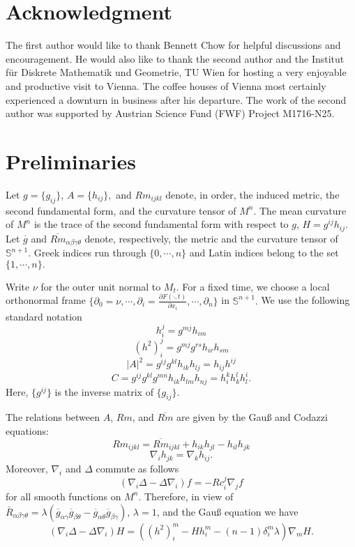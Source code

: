 \documentclass{amsart}
\theoremstyle{definition}
\theoremstyle{remark}
\numberwithin{equation}{section}
\begin{document}
\section*{Acknowledgment}
The first author would like to thank Bennett Chow for helpful discussions and encouragement. He would also like to thank the second author and the Institut f\"ur Diskrete Mathematik und Geometrie, TU Wien for hosting a very enjoyable and productive visit to Vienna. The coffee houses of Vienna most certainly experienced a downturn in business after his departure. The work of the second author was supported by Austrian Science Fund (FWF) Project M1716-N25.

\section{Preliminaries}
Let $g=\{g_{ij}\}$, $A=\{h_{ij}\},$ and $Rm_{ijkl}$ denote, in order, the induced metric, the second fundamental form, and the curvature tensor of $M^n$. The mean curvature of $M^n$ is the trace of the second fundamental form with respect to $g$, $H=g^{ij}h_{ij}.$ Let $\overline{g}$ and $\overline{Rm}_{\alpha\beta\gamma\theta}$ denote, respectively, the metric and the curvature tensor of $\mathbb{S}^{n+1}$. Greek indices run through $\{0,\cdots,n\}$ and Latin indices belong to the set $\{1,\cdots,n\}.$

Write $\nu$ for the outer unit normal to $M_t.$ For a fixed time, we choose a local orthonormal frame $\{\partial_0=\nu,\cdots,\partial_i=\frac{\partial F(\cdot,t)}{\partial x_i},\cdots,\partial_n\}$ in $\mathbb{S}^{n+1}.$ We use the following standard notation
\[h_i^j=g^{mj}h_{im}\]
\[(h^2)_i^j=g^{mj}g^{rs}h_{ir}h_{sm}\]
\[|A|^2=g^{ij}g^{kl}h_{ik}h_{lj}=h_{ij}h^{ij}\]
\[C=g^{ij}g^{kl}g^{mn}h_{ik}h_{lm}h_{nj}=h_i^kh_k^lh_l^i.\]
Here, $\{g^{ij}\}$ is the inverse matrix of $\{g_{ij}\}.$

The relations between $A$, $Rm$, and $\overline{Rm}$ are given by the Gau{\ss} and Codazzi equations:
\[Rm_{ijkl}=\overline{Rm}_{ijkl}+h_{ik}h_{jl}-h_{il}h_{jk}\]
\[\nabla_ih_{jk}=\nabla_{k}h_{ij}.\]
Moreover, $\nabla_i$ and $\Delta$ commute as follows
\[(\nabla_i\Delta-\Delta\nabla_i)f=-Rc_i^j\nabla_jf\]
for all smooth functions on $M^n.$
Therefore, in view of $\bar{R}_{\alpha\beta\gamma\theta}=\lambda (\overline{g}_{\alpha\gamma}\overline{g}_{\beta\theta}-\overline{g}_{\alpha\theta}\overline{g}_{\beta\gamma})$, $\lambda =1$, and the Gau{\ss} equation we have
\begin{equation}\label{eq: commute}
(\nabla_i\Delta-\Delta\nabla_i)H=((h^2)_i^m-Hh_i^m-(n-1)\delta_i^m\lambda )\nabla_mH.
\end{equation}
\end{document}
